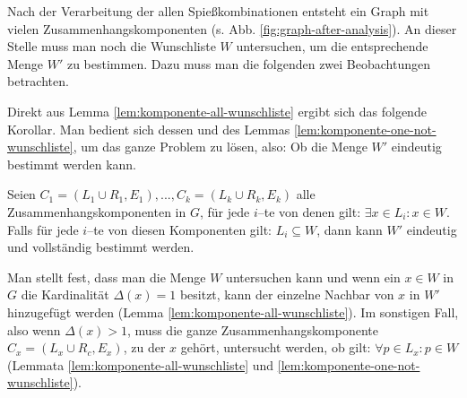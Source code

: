 \begin{comment}
\begin{lemma}\label{lem:grad-groesser1}
Seien $x \in A$ ein Knoten in $G$ und seine Kardinalität $\Delta(x) = k > 1$.
Dann gehört $x$ zu einer Zusammenhangskomponente $C = (V_c, E_c)$, wobei
die Menge $V_c$ aus insgesamt $2k$ Knoten $x_1, ..., x_k \in A$ 
und $y_1, ..., y_k \in B$ besteht. Für die Menge $E_c$ gilt:
$E_c = (A \setminus V_c) \times (B \setminus V_c) $.
$C$ ist deshalb selbt ein vollständiger, bipartiter Graph.
\end{lemma}
\begin{proof}
Der Beweis erfolgt durch Widerspruch.
\TODO{Beweis} 
\end{proof}
\end{comment}




Nach der Verarbeitung der allen Spießkombinationen entsteht ein Graph mit vielen Zusammenhangskomponenten
(s. Abb. \ref{fig:graph-after-analysis}).
An dieser Stelle muss man noch die Wunschliste $W$ untersuchen, um die entsprechende Menge $W'$ zu bestimmen.
Dazu muss man die folgenden zwei Beobachtungen betrachten.





Direkt aus Lemma \ref{lem:komponente-all-wunschliste} ergibt sich das folgende Korollar.
Man bedient sich dessen und des Lemmas \ref{lem:komponente-one-not-wunschliste}, um das ganze Problem zu lösen, also: Ob die Menge $W'$ eindeutig bestimmt werden kann.

\begin{korollar}
Seien $C_1 = (L_1 \cup R_1, E_1), ..., C_k = (L_k \cup R_k, E_k)$ alle Zusammenhangskomponenten in $G$,
für jede $i$--te von denen gilt: $\exists x \in L_i : x \in W$.
Falls für jede $i$--te von diesen Komponenten gilt: $L_i \subseteq W$, dann
kann $W'$ eindeutig und vollständig bestimmt werden.
\end{korollar}

Man stellt fest, dass man die Menge $W$ untersuchen kann und wenn ein $x \in W$ in $G$ die
Kardinalität $\Delta(x) = 1$ besitzt, kann der einzelne Nachbar von $x$ in $W'$ hinzugefügt werden
(Lemma \ref{lem:komponente-all-wunschliste}).
Im sonstigen Fall, also wenn $\Delta(x) > 1$, muss die ganze Zusammenhangskomponente
$C_x = (L_x \cup R_c, E_x)$, zu der $x$ gehört, untersucht werden, ob gilt: $\forall p \in L_x: p \in W$
(Lemmata \ref{lem:komponente-all-wunschliste} und \ref{lem:komponente-one-not-wunschliste}).\\

